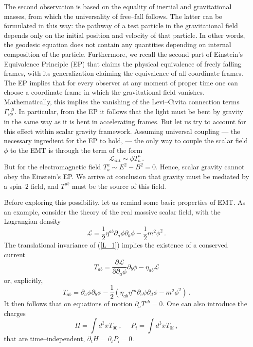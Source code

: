 \documentclass[11pt,a4paper]{article}
\begin{document}
The second observation is based on the equality of inertial and gravitational masses, from which the universality of free--fall follows.
The latter can be formulated in this way: the pathway of a test particle in the gravitational field depends only on the initial position and velocity of that particle. In other words, the geodesic equation does not contain any quantities depending on internal composition of the particle. Furthermore, we recall the second part of Einstein's Equivalence Principle (EP) that claims the physical equivalence of freely falling frames, with its generalization claiming the equivalence of all coordinate frames. The EP implies that for every observer at any moment of proper time one can choose a coordinate frame in which the gravitational field vanishes. Mathematically, this implies the vanishing of the Levi--Civita connection terms $\Gamma^{~~~\mu}_{\nu\rho}$.
In particular, from the EP it follows that the light must be bent by gravity in the same way as it is bent in accelerating frames. But let us try to account for this effect within scalar gravity framework. Assuming universal coupling --- the necessary ingredient for the EP to hold, --- the only way to couple the scalar field $\phi$ to the EMT is through the term of the form
\begin{equation}
\mathcal{L}_{int}\sim \phi T^a_a  \,.
\end{equation}
But for the electromagnetic field $T^a_a \sim E^2-B^2=0$. Hence, scalar gravity cannot obey the Einstein's EP. We arrive at conclusion that gravity must be mediated by a spin--$2$ field, and $T^{ab}$ must be the source of this field.

Before exploring this possibility, let us remind some basic properties of EMT. As an example, consider the theory of the real massive scalar field, with the Lagrangian density
\begin{equation}\label{L_1}
\mathcal{L}=\dfrac{1}{2}\eta^{ab}\partial_a\phi\partial_b\phi-\dfrac{1}{2}m^2\phi^2  \,.
\end{equation}
The translational invariance of (\ref{L_1}) implies the existence of a conserved current
\begin{equation}
T_{ab}=\dfrac{\partial\mathcal{L}}{\partial\partial_a\phi}\partial_b\phi-\eta_{ab}\mathcal{L}
\end{equation}
or, explicitly,
\begin{equation}\label{ScalarFieldEMT}
T_{ab}=\partial_a\phi\partial_b\phi-\dfrac{1}{2}\left(\eta_{ab}\eta^{cd}\partial_c\phi\partial_d\phi-m^2\phi^2\right)   \,.
\end{equation}
It then follows that on equations of motion $\partial_a T^{ab}=0$. One can also introduce the charges
\begin{equation}
H=\int d^3x T_{00}  \,,~~~~~~P_i=\int d^3x T_{0i} \,,
\end{equation}
that are time--independent, $\partial_tH=\partial_tP_i=0$.
\end{document}
